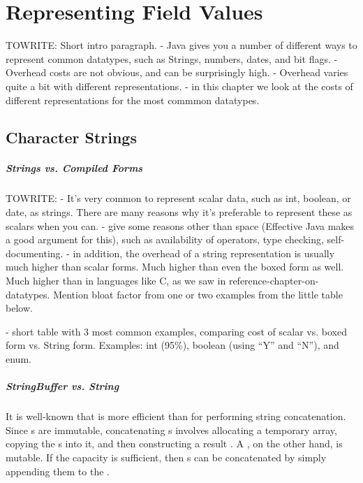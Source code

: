 \chapter{Representing Field Values}
TOWRITE: Short intro paragraph.
- Java gives you a number of different ways to represent common datatypes, such
as Strings, numbers, dates, and bit flags.
- Overhead costs are not obvious, and can be surprisingly high.
- Overhead varies quite a bit with different representations.
- in this chapter we look at the costs of different representations for the most 
commmon datatypes.


\section{Character Strings}
\paragraph{Strings vs. Compiled Forms}
TOWRITE:
- It's very common to represent scalar data, such as int, boolean, or date, as
strings. There are many reasons why it's preferable to represent these as
scalars when you can. - give some reasons other than space (Effective Java makes
a good argument for this), such as availability of operators, type checking, self-documenting.  - in
addition, the overhead of a string representation is usually much higher than scalar forms. 
Much higher than even the boxed form as well.  Much higher
than in languages like C, as we saw in reference-chapter-on-datatypes.  Mention
bloat factor from one or two examples from the little table below.

- short table with 3 most common examples, comparing cost of scalar
vs. boxed form vs. String form.  Examples: int (95\%), boolean (using ``Y''
and ``N''), and enum. 

\paragraph{StringBuffer vs. String}

It is well-known that  is more efficient than
 for performing string concatenation. Since s are
immutable, concatenating s involves allocating a temporary
 array, copying the s into it, and then constructing
a result . A , on the other hand, is mutable.
If the  capacity is sufficient, then s
can be concatenated by simply appending them to the .

